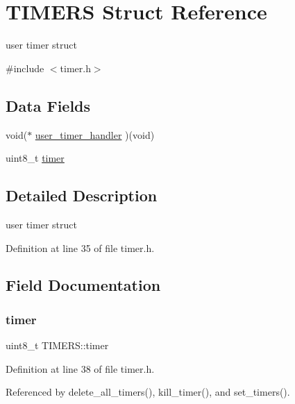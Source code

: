 \hypertarget{structTIMERS}{}\section{T\+I\+M\+E\+RS Struct Reference}
\label{structTIMERS}


user timer struct  




{\ttfamily \#include $<$timer.\+h$>$}

\subsection*{Data Fields}
\begin{DoxyCompactItemize}
\item 
void($\ast$ \hyperlink{structTIMERS_a4326e05ca52d80147efafd0d246ecb41}{user\+\_\+timer\+\_\+handler} )(void)
\item 
uint8\+\_\+t \hyperlink{structTIMERS_a0b10fdb7b0e6b1d3ca49718f47c4514d}{timer}
\end{DoxyCompactItemize}


\subsection{Detailed Description}
user timer struct 

Definition at line 35 of file timer.\+h.



\subsection{Field Documentation}
\mbox{\label{structTIMERS_a0b10fdb7b0e6b1d3ca49718f47c4514d}} 
\subsubsection{\texorpdfstring{timer}{timer}}
{\footnotesize\ttfamily uint8\+\_\+t T\+I\+M\+E\+R\+S\+::timer}



Definition at line 38 of file timer.\+h.



Referenced by delete\+\_\+all\+\_\+timers(), kill\+\_\+timer(), and set\+\_\+timers().

\mbox{\label{structTIMERS_a4326e05ca52d80147efafd0d246ecb41}} 

